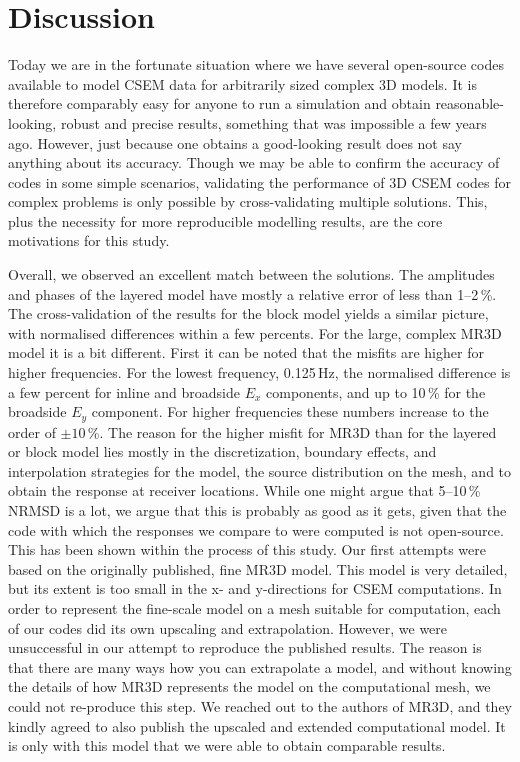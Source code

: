 \documentclass[a4paper, extra, camera,%
]{gji}
\begin{document}
\section{Discussion}

Today we are in the fortunate situation where we have several open-source codes available to model CSEM data for arbitrarily sized complex 3D models. It is therefore comparably easy for anyone to run a simulation and obtain reasonable-looking, robust and precise results, something that was impossible a few years ago. However, just because one obtains a good-looking result does not say anything about its accuracy. Though we may be able to confirm the accuracy of codes in some simple scenarios, validating the performance of 3D CSEM codes for complex problems is only possible by cross-validating multiple solutions. This, plus the necessity for more reproducible modelling results, are the core motivations for this study.

Overall, we observed an excellent match between the solutions. The amplitudes and phases of the layered model have mostly a relative error of less than 1--2\,\%. The cross-validation of the results for the block model yields a similar picture, with normalised differences within a few percents. For the large, complex MR3D model it is a bit different. First it can be noted that the misfits are higher for higher frequencies. For the lowest frequency, 0.125\,Hz, the normalised difference is a few percent for inline and broadside $E_x$ components, and up to 10\,\% for the broadside $E_y$ component. For higher frequencies these numbers increase to the order of $\pm10\,$\%. The reason for the higher misfit for MR3D than for the layered or block model lies mostly in the discretization, boundary effects, and interpolation strategies for the model, the source distribution on the mesh, and to obtain the response at receiver locations. While one might argue that 5--10\,\% NRMSD is a lot, we argue that this is probably as good as it gets, given that the code with which the responses we compare to were computed is not open-source. This has been shown within the process of this study. Our first attempts were based on the originally published, fine MR3D model. This model is very detailed, but its extent is too small in the x- and y-directions for CSEM computations. In order to represent the fine-scale model on a mesh suitable for computation, each of our codes did its own upscaling and extrapolation. However, we were unsuccessful in our attempt to reproduce the published results.  The reason is that there are many ways how you can extrapolate a model, and without knowing the details of how MR3D represents the model on the computational mesh, we could not re-produce this step. We reached out to the authors of MR3D, and they kindly agreed to also publish the upscaled and extended computational model. It is only with this model that we were able to obtain comparable results.
\end{document}
